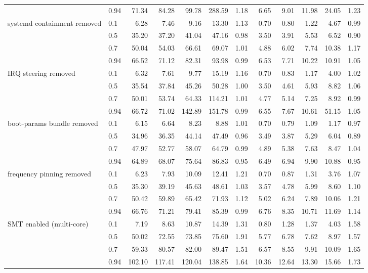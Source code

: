 \begin{table}
{\begin{tabular}{llrrrrrrrrrr}
 & 0.94 & 71.34 & 84.28 & 99.78 & 288.59 & 1.18 & 6.65 & 9.01 & 11.98 & 24.05 & 1.23 \\
\cmidrule{1-12}
\multirow[t]{4}{*}{systemd containment removed} & 0.1 & 6.28 & 7.46 & 9.16 & 13.30 & 1.13 & 0.70 & 0.80 & 1.22 & 4.67 & 0.99 \\
 & 0.5 & 35.20 & 37.20 & 41.04 & 47.16 & 0.98 & 3.50 & 3.91 & 5.53 & 6.52 & 0.90 \\
 & 0.7 & 50.04 & 54.03 & 66.61 & 69.07 & 1.01 & 4.88 & 6.02 & 7.74 & 10.38 & 1.17 \\
 & 0.94 & 66.52 & 71.12 & 82.31 & 93.98 & 0.99 & 6.53 & 7.71 & 10.22 & 10.91 & 1.05 \\
\cmidrule{1-12}
\multirow[t]{4}{*}{IRQ steering removed} & 0.1 & 6.32 & 7.61 & 9.77 & 15.19 & 1.16 & 0.70 & 0.83 & 1.17 & 4.00 & 1.02 \\
 & 0.5 & 35.54 & 37.84 & 45.26 & 50.28 & 1.00 & 3.50 & 4.61 & 5.93 & 8.82 & 1.06 \\
 & 0.7 & 50.01 & 53.74 & 64.33 & 114.21 & 1.01 & 4.77 & 5.14 & 7.25 & 8.92 & 0.99 \\
 & 0.94 & 66.72 & 71.02 & 142.89 & 151.78 & 0.99 & 6.55 & 7.67 & 10.61 & 51.15 & 1.05 \\
\cmidrule{1-12}
\multirow[t]{4}{*}{boot-params bundle removed} & 0.1 & 6.15 & 6.64 & 8.23 & 8.88 & 1.01 & 0.70 & 0.79 & 1.09 & 1.17 & 0.97 \\
 & 0.5 & 34.96 & 36.35 & 44.14 & 47.49 & 0.96 & 3.49 & 3.87 & 5.29 & 6.04 & 0.89 \\
 & 0.7 & 47.97 & 52.77 & 58.07 & 64.79 & 0.99 & 4.89 & 5.38 & 7.63 & 8.47 & 1.04 \\
 & 0.94 & 64.89 & 68.07 & 75.64 & 86.83 & 0.95 & 6.49 & 6.94 & 9.90 & 10.88 & 0.95 \\
\cmidrule{1-12}
\multirow[t]{4}{*}{frequency pinning removed} & 0.1 & 6.23 & 7.93 & 10.09 & 12.41 & 1.21 & 0.70 & 0.87 & 1.31 & 3.76 & 1.07 \\
 & 0.5 & 35.30 & 39.19 & 45.63 & 48.61 & 1.03 & 3.57 & 4.78 & 5.99 & 8.60 & 1.10 \\
 & 0.7 & 50.42 & 59.89 & 65.42 & 71.93 & 1.12 & 5.02 & 6.24 & 7.89 & 10.06 & 1.21 \\
 & 0.94 & 66.76 & 71.21 & 79.41 & 85.39 & 0.99 & 6.76 & 8.35 & 10.71 & 11.69 & 1.14 \\
\cmidrule{1-12}
\multirow[t]{4}{*}{SMT enabled (multi-core)} & 0.1 & 7.19 & 8.63 & 10.87 & 14.39 & 1.31 & 0.80 & 1.28 & 1.37 & 4.03 & 1.58 \\
 & 0.5 & 50.02 & 72.55 & 73.85 & 75.60 & 1.91 & 5.77 & 6.78 & 7.62 & 8.97 & 1.57 \\
 & 0.7 & 59.33 & 80.57 & 82.00 & 89.47 & 1.51 & 6.57 & 8.55 & 9.91 & 10.09 & 1.65 \\
 & 0.94 & 102.10 & 117.41 & 120.04 & 138.85 & 1.64 & 10.36 & 12.64 & 13.30 & 15.66 & 1.73 \\
\cmidrule{1-12}
\bottomrule
\end{tabular}%
}
\end{table}
